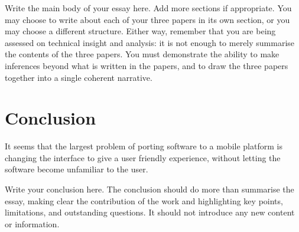 \documentclass{scrartcl}
\begin{document}
Write the main body of your essay here. Add more sections if appropriate. You may choose to write about each of your three papers in its own section, or you may choose a different structure. Either way, remember that you are being assessed on technical insight and analysis: it is not enough to merely summarise the contents of the three papers. You must demonstrate the ability to make inferences beyond what is written in the papers, and to draw the three papers together into a single coherent narrative.


\section{Conclusion}

It seems that the largest problem of porting software to a mobile platform is changing the interface to give a user friendly experience, without letting the software become unfamiliar to the user.

Write your conclusion here. The conclusion should do more than summarise the essay, making clear the contribution of the work and highlighting key points, limitations, and outstanding questions. It should not introduce any new content or information.



\end{document}
